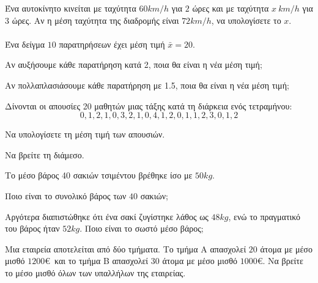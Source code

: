 \documentclass[11pt,a4paper,modern]{FFExercises}
\begin{document}
\askhsh
Ένα αυτοκίνητο κινείται με ταχύτητα $60 \si{km/h}$ για $2$ ώρες και με ταχύτητα $x\  \si{km/h}$ για $3$ ώρες. Αν η μέση ταχύτητα της διαδρομής είναι $72 \si{km/h}$, να υπολογίσετε το $x$.\\\\

\askhsh
Ένα δείγμα $10$ παρατηρήσεων έχει μέση τιμή $\bar{x} = 20$.
\begin{alist}
    \item Αν αυξήσουμε κάθε παρατήρηση κατά 2, ποια θα είναι η νέα μέση τιμή;
    \item Αν πολλαπλασιάσουμε κάθε παρατήρηση με 1.5, ποια θα είναι η νέα μέση τιμή;
\end{alist}

\askhsh
Δίνονται οι απουσίες 20 μαθητών μιας τάξης κατά τη διάρκεια ενός τετραμήνου:
\[ 0, 1, 2, 1, 0, 3, 2, 1, 0, 4, 1, 2, 0, 1, 1, 2, 3, 0, 1, 2 \]
\begin{alist}
    \item Να υπολογίσετε τη μέση τιμή των απουσιών.
    \item Να βρείτε τη διάμεσο.
\end{alist}

\askhsh
Το μέσο βάρος 40 σακιών τσιμέντου βρέθηκε ίσο με $50 \si{kg}$.
\begin{alist}
    \item Ποιο είναι το συνολικό βάρος των $40$ σακιών;
    \item Αργότερα διαπιστώθηκε ότι ένα σακί ζυγίστηκε λάθος ως $48 \si{kg}$, ενώ το πραγματικό του βάρος ήταν $52 \si{kg}$. Ποιο είναι το σωστό μέσο βάρος;
\end{alist}

\askhsh
Μια εταιρεία αποτελείται από δύο τμήματα. Το τμήμα Α απασχολεί $20$ άτομα με μέσο μισθό $1200$\euro\ και το τμήμα Β απασχολεί $30$ άτομα με μέσο μισθό $1000$\euro. Να βρείτε το μέσο μισθό όλων των υπαλλήλων της εταιρείας.\\\\
\end{document}
